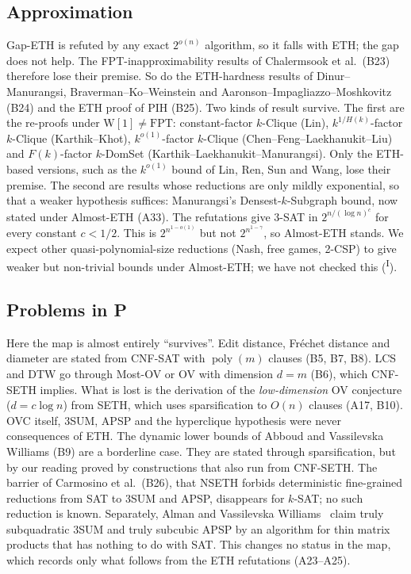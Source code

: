 \documentclass[10pt]{amsart}
\theoremstyle{plain}
\theoremstyle{definition}
\theoremstyle{remark}
\numberwithin{equation}{section}
\newcommand{\poly}{\operatorname{poly}}
\newcommand{\Inf}{\textsuperscript{I}}
\begin{document}
\subsection{Approximation}
Gap-ETH is refuted by any exact $2^{o(n)}$ algorithm, so it falls with ETH; the gap does not help.
The FPT-inapproximability results of Chalermsook et al.\ (B23) therefore lose their premise. So do
the ETH-hardness results of Dinur--Manurangsi, Braverman--Ko--Weinstein and
Aaronson--Impagliazzo--Moshkovitz (B24) and the ETH proof of PIH (B25). Two kinds of result
survive. The first are the re-proofs under $\mathrm{W}[1]\ne\mathrm{FPT}$: constant-factor
$k$-Clique (Lin), $k^{1/H(k)}$-factor $k$-Clique (Karthik--Khot), $k^{o(1)}$-factor $k$-Clique
(Chen--Feng--Laekhanukit--Liu) and $F(k)$-factor $k$-DomSet (Karthik--Laekhanukit--Manurangsi).
Only the ETH-based versions, such as the $k^{o(1)}$ bound of Lin, Ren, Sun and Wang, lose their
premise. The second are results whose reductions are only mildly
exponential, so that a weaker hypothesis suffices: Manurangsi's Densest-$k$-Subgraph bound, now
stated under Almost-ETH (A33). The refutations give $3$-SAT in $2^{n/(\log n)^{c}}$ for every
constant $c<1/2$. This is $2^{n^{1-o(1)}}$ but not $2^{n^{1-\gamma}}$, so Almost-ETH stands. We
expect other quasi-polynomial-size reductions (Nash, free games, 2-CSP) to give weaker but
non-trivial bounds under Almost-ETH; we have not checked this (\Inf).

\subsection{Problems in P}
Here the map is almost entirely ``survives''. Edit distance, Fr\'echet distance and diameter are
stated from CNF-SAT with $\poly(m)$ clauses (B5, B7, B8). LCS and DTW go through Most-OV or OV
with dimension $d=m$ (B6), which CNF-SETH implies. What is lost is the derivation of the
\emph{low-dimension} OV conjecture ($d=c\log n$) from SETH, which uses sparsification to $O(n)$
clauses (A17, B10). OVC itself, 3SUM, APSP and the hyperclique hypothesis were never consequences
of ETH. The dynamic lower bounds of Abboud and Vassilevska Williams (B9) are a borderline case.
They are stated through sparsification, but by our reading proved by constructions that also run
from CNF-SETH. The barrier of Carmosino et al.\ (B26), that NSETH forbids deterministic
fine-grained reductions from SAT to 3SUM and APSP, disappears for $k$-SAT; no such reduction is
known. Separately, Alman and Vassilevska Williams~\cite{AVW26} claim truly subquadratic 3SUM and
truly subcubic APSP by an algorithm for thin matrix products that has nothing to do with SAT. This
changes no status in the map, which records only what follows from the ETH refutations (A23--A25).
\end{document}
